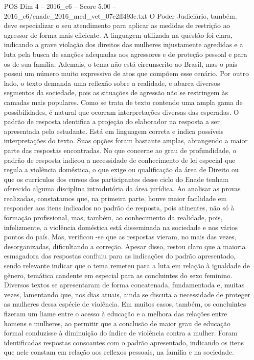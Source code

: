 \begin{textsample}{POS Dim 4 – 2016\_c6 – Score 5.00 – 2016\_c6/enade\_2016\_med\_vet\_07e2ff493e.txt}
O Poder Judiciário, também, deve especializar o seu atendimento para aplicar as medidas de restrição ao agressor de forma mais eficiente.
A linguagem utilizada na questão foi clara, indicando a grave violação dos direitos das mulheres injustamente agredidas e a luta pela busca de sanções adequadas aos agressores e de proteção pessoal e para os de sua família.
Ademais, o tema não está circunscrito ao Brasil, mas o país possui um número muito expressivo de atos que compõem esse cenário.
Por outro lado, o texto demanda uma reflexão sobre a realidade, e abarca diversos segmentos da sociedade, pois as situações de agressão não se restringem às camadas mais populares.
Como se trata de texto contendo uma ampla gama de possibilidades, é natural que ocorram interpretações diversas das esperadas.
O padrão de resposta identifica a projeção do elaborador na resposta a ser apresentada pelo estudante.
Está em linguagem correta e indica possíveis interpretações do texto.
Suas opções foram bastante amplas, abrangendo a maior parte das respostas encontradas.
No que concerne ao grau de profundidade, o padrão de resposta indicou a necessidade de conhecimento de lei especial que regula a violência doméstica, o que exige ou qualificação da área de Direito ou que os currículos dos cursos dos participantes desse ciclo do Enade tenham oferecido alguma disciplina introdutória da área jurídica.
Ao analisar as provas realizadas, constatamos que, na primeira parte, houve maior facilidade em responder aos itens indicados no padrão de resposta, pois atinentes, não só à formação profissional, mas, também, ao conhecimento da realidade, pois, infelizmente, a violência doméstica está disseminada na sociedade e nos vários pontos do país.
Mas, verificou -se que as respostas vieram, no mais das vezes, desorganizadas, dificultando a correção.
Apesar disso, restou claro que a maioria esmagadora das respostas confluiu para as indicações do padrão apresentado, sendo relevante indicar que o tema remeteu para a luta em relação à igualdade de gênero, temática candente em especial para as concluintes do sexo feminino.
Diversos textos se apresentaram de forma concatenada, fundamentada e, muitas vezes, lamentando que, nos dias atuais, ainda se discuta a necessidade de proteger as mulheres dessa espécie de violência.
Em muitos casos, também, os concluintes fizeram um liame entre o acesso à educação e a melhora das relações entre homens e mulheres, ao permitir que a conclusão de maior grau de educação formal conduzisse à diminuição do índice de violência contra a mulher.
Foram identificadas respostas consoantes com o padrão apresentado, indicando os itens que nele constam em relação aos reflexos pessoais, na família e na sociedade.

\end{textsample}
